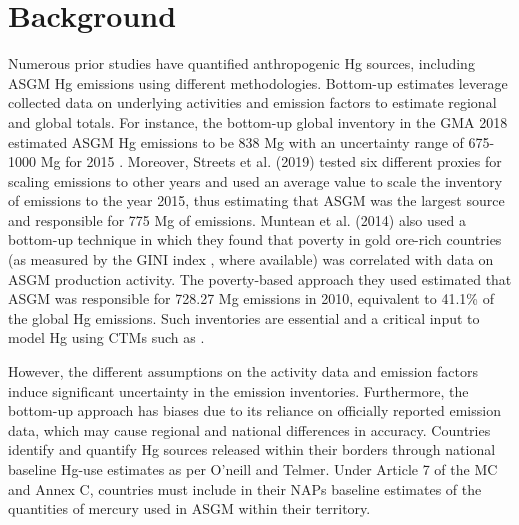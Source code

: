 \section{Background}
\begin{flushleft}


 Numerous prior studies have quantified anthropogenic Hg sources, including ASGM Hg emissions using different methodologies. Bottom-up estimates leverage collected data on underlying activities and emission factors to estimate regional and global totals. For instance, the bottom-up global inventory in the GMA 2018 estimated ASGM Hg emissions to be 838 Mg with an uncertainty range of 675-1000 Mg for 2015 \cite{united_nations_environment_programme_technical_2019,steenhuisen_development_2019}. Moreover, Streets et al. (2019) tested six different proxies for scaling emissions to other years and used an average value to scale the inventory of emissions to the year 2015, thus estimating that ASGM was the largest source and responsible for 775 Mg of emissions\cite{streets_global_2019}. Muntean et al. (2014) also used a bottom-up technique in which they found that poverty in gold ore-rich countries (as measured by the GINI index \cite{sadefo_kamdem_nice_2012}, where available) was correlated with data on ASGM production activity. The poverty-based approach they used estimated that ASGM was responsible for 728.27 Mg emissions in 2010, equivalent to 41.1\% of the global Hg emissions\cite{muntean_evaluating_2018}. Such inventories are essential and a critical input to model Hg using CTMs such as \gc. 
 \end{flushleft}
 
 \begin{flushleft}
 However, the different assumptions on the activity data and emission factors induce significant uncertainty in the emission inventories. Furthermore, the bottom-up approach has biases due to its reliance on officially reported emission data, which may cause regional and national differences in accuracy. Countries identify and quantify Hg sources released within their borders through national baseline Hg-use estimates as per O'neill and Telmer\cite{oneill_estimating_2017}. Under Article 7 of the MC and Annex C, countries must include in their NAPs baseline estimates of the quantities of mercury used in ASGM within their territory\cite{united_nations_environment_programme_estimating_2017}.  
 \end{flushleft}
 



